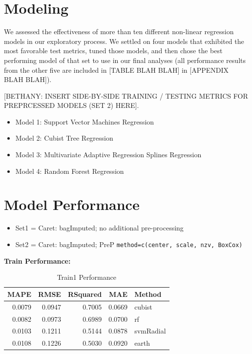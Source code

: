 \documentclass[]{report}
\providecommand{\tightlist}{%
  \setlength{\itemsep}{0pt}\setlength{\parskip}{0pt}}
\begin{document}
\hypertarget{modeling}{%
\chapter{Modeling}\label{modeling}}

We assessed the effectiveness of more than ten different non-linear
regression models in our exploratory process. We settled on four models
that exhibited the most favorable test metrics, tuned those models, and
then chose the best performing model of that set to use in our final
analyses (all performance results from the other five are included in
{[}TABLE BLAH BLAH{]} in {[}APPENDIX BLAH BLAH{]}).

{[}BETHANY: INSERT SIDE-BY-SIDE TRAINING / TESTING METRICS FOR
PREPRCESSED MODELS (SET 2) HERE{]}.

\begin{itemize}
\tightlist
\item
  Model 1: Support Vector Machines Regression
\item
  Model 2: Cubist Tree Regression
\item
  Model 3: Multivariate Adaptive Regression Splines Regression
\item
  Model 4: Random Forest Regression
\end{itemize}

\hypertarget{model-performance}{%
\chapter{Model Performance}\label{model-performance}}

\begin{itemize}
\tightlist
\item
  Set1 = Caret: bagImputed; no additional pre-processing\\
\item
  Set2 = Caret: bagImputed; PreP
  \texttt{method=c(\textquotesingle{}center\textquotesingle{},\ \textquotesingle{}scale\textquotesingle{},\ \textquotesingle{}nzv\textquotesingle{},\ \textquotesingle{}BoxCox\textquotesingle{})}
\end{itemize}

\textbf{Train Performance:}

\begin{table}[H]

\caption{\label{tab:unnamed-chunk-7}Train1 Performance}
\centering
\fontsize{8}{10}\selectfont
\begin{tabular}{rrrrl}
\toprule
MAPE & RMSE & RSquared & MAE & Method\\
\midrule
\rowcolor{gray!6}  0.0079 & 0.0947 & 0.7005 & 0.0669 & cubist\\
0.0082 & 0.0973 & 0.6989 & 0.0700 & rf\\
\rowcolor{gray!6}  0.0103 & 0.1211 & 0.5144 & 0.0878 & svmRadial\\
0.0108 & 0.1226 & 0.5030 & 0.0920 & earth\\
\bottomrule
\end{tabular}
\end{table}
\end{document}

